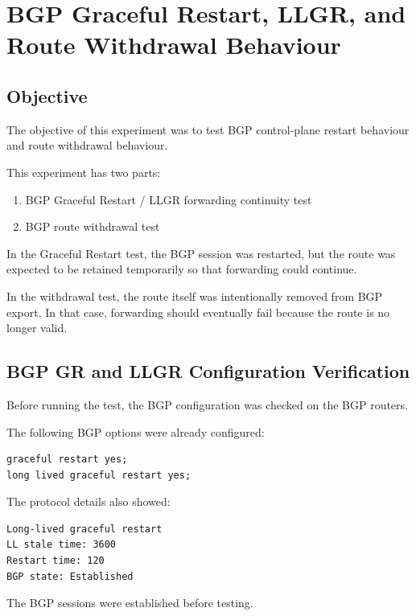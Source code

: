 \section{BGP Graceful Restart, LLGR, and Route Withdrawal Behaviour}

\subsection{Objective}

The objective of this experiment was to test BGP control-plane restart behaviour and route withdrawal behaviour.

This experiment has two parts:

\begin{enumerate}
\item BGP Graceful Restart / LLGR forwarding continuity test
\item BGP route withdrawal test
\end{enumerate}

In the Graceful Restart test, the BGP session was restarted, but the route was expected to be retained temporarily so that forwarding could continue.

In the withdrawal test, the route itself was intentionally removed from BGP export. In that case, forwarding should eventually fail because the route is no longer valid.

\subsection{BGP GR and LLGR Configuration Verification}

Before running the test, the BGP configuration was checked on the BGP routers.

The following BGP options were already configured:

\begin{verbatim}
graceful restart yes;
long lived graceful restart yes;
\end{verbatim}

The protocol details also showed:

\begin{verbatim}
Long-lived graceful restart
LL stale time: 3600
Restart time: 120
BGP state: Established
\end{verbatim}

The BGP sessions were established before testing.

